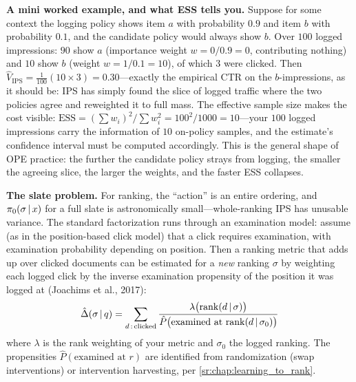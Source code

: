 \textbf{A mini worked example, and what ESS tells you.} Suppose for some context the logging policy shows item $a$ with probability $0.9$ and item $b$ with probability $0.1$, and the candidate policy would always show $b$. Over $100$ logged impressions: $90$ show $a$ (importance weight $w = 0/0.9 = 0$, contributing nothing) and $10$ show $b$ (weight $w = 1/0.1 = 10$), of which $3$ were clicked. Then $\hat{V}_{\mathrm{IPS}} = \frac{1}{100}(10 \times 3) = 0.30$---exactly the empirical CTR on the $b$-impressions, as it should be: IPS has simply found the slice of logged traffic where the two policies agree and reweighted it to full mass. The effective sample size makes the cost visible: $\mathrm{ESS} = (\sum w_i)^2 / \sum w_i^2 = 100^2/1000 = 10$---your $100$ logged impressions carry the information of $10$ on-policy samples, and the estimate's confidence interval must be computed accordingly. This is the general shape of OPE practice: the further the candidate policy strays from logging, the smaller the agreeing slice, the larger the weights, and the faster ESS collapses.

\textbf{The slate problem.} For ranking, the ``action'' is an entire ordering, and $\pi_0(\sigma \,|\, x)$ for a full slate is astronomically small---whole-ranking IPS has unusable variance. The standard factorization runs through an examination model: assume (as in the position-based click model) that a click requires examination, with examination probability depending on position. Then a ranking metric that adds up over clicked documents can be estimated for a \textit{new} ranking $\sigma$ by weighting each logged click by the inverse examination propensity of the position it was logged at (Joachims et al., 2017):
\begin{equation}
\hat{\Delta}(\sigma \,|\, q) = \sum_{d\,:\,\text{clicked}} \frac{\lambda\big(\mathrm{rank}(d \,|\, \sigma)\big)}{\hat{P}\big(\text{examined at } \mathrm{rank}(d \,|\, \sigma_0)\big)}
\end{equation}
where $\lambda$ is the rank weighting of your metric and $\sigma_0$ the logged ranking. The propensities $\hat{P}(\text{examined at } r)$ are identified from randomization (swap interventions) or intervention harvesting, per \ref{sr:chap:learning_to_rank}.

